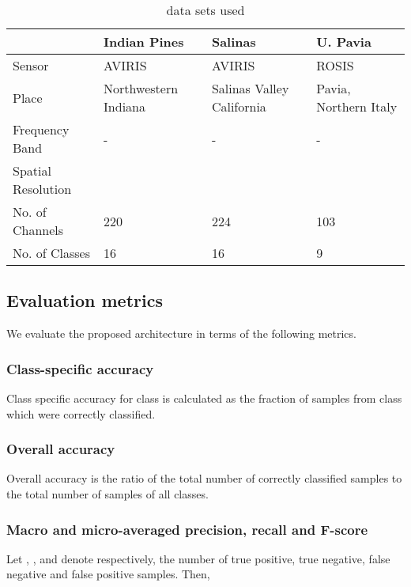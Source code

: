 \documentclass[journal]{IEEEtran}
\begin{document}
\begin{table}
\caption{data sets used}
\label{table:data sets}
\centering
\begin{tabular}{l|p{1.5cm}|p{1.5cm}|p{1.5cm}}

     & Indian Pines & Salinas & U. Pavia  \\ \hline\hline 
Sensor & AVIRIS     & AVIRIS  & ROSIS \\ \hline 
Place  & Northwestern Indiana & Salinas Valley California & Pavia, Northern Italy \\ \hline 
Frequency Band & - & - & - \\ \hline 
Spatial Resolution &  &  &  \\ \hline 
No. of Channels & 220 & 224 & 103 \\ \hline 
No. of Classes & 16 & 16 & 9 \\ \hline
\end{tabular}
\end{table}


\subsection{Evaluation metrics}
We evaluate the proposed architecture in terms of the following metrics. \\

\subsubsection{Class-specific accuracy} 
Class specific accuracy for class  is calculated as the fraction of samples from class  which were correctly classified. \\

\subsubsection{Overall accuracy} 
Overall accuracy is the ratio of the total number of correctly classified samples to the total number of samples of all classes.\\

\subsubsection{Macro and micro-averaged precision, recall and F-score}
Let , ,  and  denote respectively, the number of true positive, true negative, false negative and false positive samples. Then,
\end{document}
